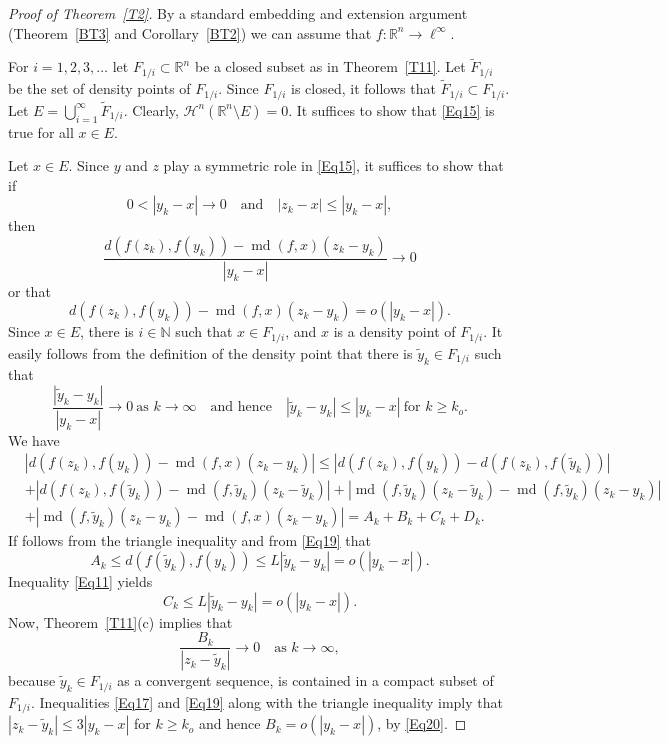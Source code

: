 \documentclass[12pt,leqno]{amsart}
\theoremstyle{definition}
\newcommand{\bbbn}{\mathbb N}
\newcommand{\bbbr}{\mathbb R}
\def\H{{\mathcal H}}
\def\md{\operatorname{md}}
\numberwithin{theorem}{section} \numberwithin{equation}{section}
\begin{document}
\begin{proof}[Proof of Theorem~\ref{T2}]
By a standard embedding and extension argument (Theorem~\ref{BT3} and Corollary~\ref{BT2}) we can assume that $f:\bbbr^n\to\ell^\infty$.

For $i=1,2,3,\ldots$ let $F_{1/i}\subset\bbbr^n$ be a closed subset as in Theorem~\ref{T11}.
Let $\tilde{F}_{1/i}$ be the set of density points of $F_{1/i}$. Since $F_{1/i}$ is closed, it follows that $\tilde{F}_{1/i}\subset {F}_{1/i}$. Let $E=\bigcup_{i=1}^\infty \tilde{F}_{1/i}$. Clearly, $\H^n(\bbbr^n\setminus E)=0$.
It suffices to show that \eqref{Eq15} is true for all $x\in E$.

Let $x\in E$. Since $y$ and $z$ play a symmetric role in \eqref{Eq15}, it suffices to show that if
\begin{equation}
\label{Eq17}
0<|y_k-x|\to 0
\quad
\text{and}
\quad
|z_k-x|\leq |y_k-x|,
\end{equation}
then
$$
\frac{d(f(z_k),f(y_k))-\md(f,x)(z_k-y_k)}{|y_k-x|}\to 0
$$
or that
\begin{equation}
\label{Eq18}
d(f(z_k),f(y_k))-\md(f,x)(z_k-y_k)=o(|y_k-x|).
\end{equation}
Since $x\in E$, there is $i\in\bbbn$ such that $x\in F_{1/i}$, and $x$ is a density point of $F_{1/i}$. It easily follows from the definition of the density point that there is $\tilde{y}_k\in F_{1/i}$  such that
\begin{equation}
\label{Eq19}
\frac{|\tilde{y}_k-y_k|}{|y_k-x|}\to 0 \ \text{as $k\to\infty$}
\quad
\text{and hence}
\quad
|\tilde{y}_k-y_k|\leq |y_k-x|\ \text{for $k\geq k_o$.}
\end{equation}
We have
\begin{equation*}
\begin{split}
& |d(f(z_k),f(y_k))-\md(f,x)(z_k-y_k)|
\leq
|d(f(z_k),f(y_k))-d(f(z_k),f(\tilde{y}_k))|\\
&+
|d(f(z_k),f(\tilde{y}_k))-\md (f,\tilde{y}_k)(z_k-\tilde{y}_k)|
+
|\md (f,\tilde{y}_k)(z_k-\tilde{y}_k)-\md (f,\tilde{y}_k)(z_k-{y}_k)|\\
&+
|\md (f,\tilde{y}_k)(z_k-{y}_k)-\md (f,x)(z_k-{y}_k)|
=
A_k+B_k+C_k+D_k.
\end{split}
\end{equation*}
If follows from the triangle inequality and from \eqref{Eq19} that
$$
A_k\leq d(f(\tilde{y}_k),f(y_k))\leq L|\tilde{y}_k-y_k|=o(|y_k-x|).
$$
Inequality \eqref{Eq11} yields
$$
C_k\leq L|\tilde{y}_k-y_k|=o(|y_k-x|).
$$
Now, Theorem~\ref{T11}(c) implies that
\begin{equation}
\label{Eq20}
\frac{B_k}{|z_k-\tilde{y}_k|}\to 0
\quad
\text{as $k\to\infty$},
\end{equation}
because $\tilde{y}_k\in F_{1/i}$ as a convergent sequence, is contained in a compact subset of $F_{1/i}$.
Inequalities \eqref{Eq17} and \eqref{Eq19} along with the triangle inequality imply that
$|z_k-\tilde{y}_k|\leq 3|y_k-x|$ for $k\geq k_o$ and hence $B_k=o(|y_k-x|)$, by \eqref{Eq20}.


\end{proof}
\end{document}
